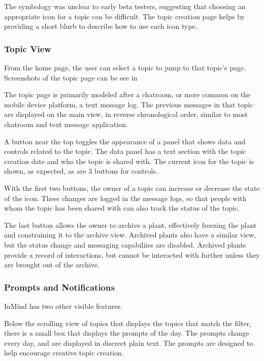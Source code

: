       The symbology was unclear to early beta testers,
      suggesting that choosing an appropriate icon for a topic can be difficult.
      The topic creation page helps by providing
      a short blurb to describe how to use each icon type.

      \subsubsection{Topic View}
      From the home page,
      the user can select a topic to jump to that topic's page.
      Screenshots of the topic page can be see in \cite{}

      The topic page is primarily modeled after a chatroom,
      or more common on the mobile device platform,
      a text message log.
      The previous messages in that topic are displayed on the main view,
      in reverse chronological order, similar to most chatroom and text message application.

      A button near the top toggles the appearance of a panel that shows data and controls
      related to the topic.
      The data panel has a text section with the topic creation date and who the topic is shared with.
      The current icon for the topic is shown, as expected, as are 3 buttons for controls.

      With the first two buttons,
      the owner of a topic can increase or decrease the state of the icon.
      These changes are logged in the message logs,
      so that people with whom the topic has been shared with
      can also track the status of the topic.

      The last button allows the owner to archive a plant,
      effectively freezing the plant and constraining it to the archive view.
      Archived plants also have a similar view,
      but the status change and messaging capabiliies are disabled.
      Archived plants provide a record of interactions,
      but cannot be interacted with further unless they are brought out of the archive.

      \subsubsection{Prompts and Notifications}
      InMind has two other visible features.

      Below the scrolling view of topics that displays the topics
      that match the filter, there is a small box that displays the prompts of the day.
      The prompts change every day, and are displayed in discreet plain text.
      The prompts are designed to help encourage creative topic creation.

